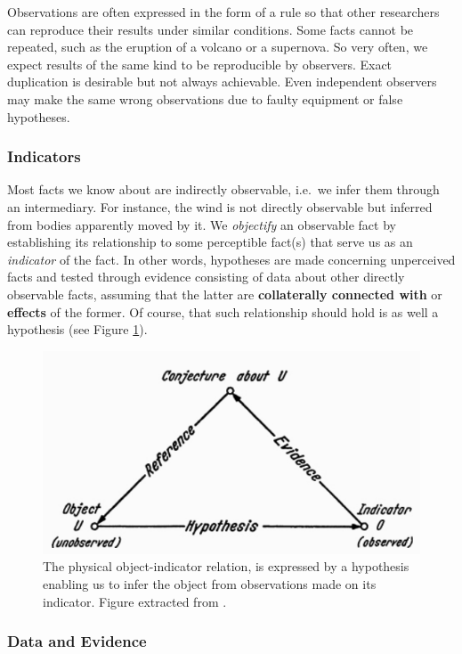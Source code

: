 \documentclass[
]{book}
\begin{document}
Observations are often expressed in the form of a rule so that other researchers can reproduce their results under similar conditions. Some facts cannot be repeated, such as the eruption of a volcano or a supernova. So very often, we expect results of the same kind to be reproducible by observers. Exact duplication is desirable but not always achievable. Even independent observers may make the same wrong observations due to faulty equipment or false hypotheses.

\hypertarget{indicators}{%
\subsubsection{Indicators}\label{indicators}}

Most facts we know about are indirectly observable, i.e.~we infer them through an intermediary. For instance, the wind is not directly observable but inferred from bodies apparently moved by it. We \emph{objectify} an observable fact by establishing its relationship to some perceptible fact(s) that serve us as an \emph{indicator} of the fact. In other words, hypotheses are made concerning unperceived facts and tested through evidence consisting of data about other directly observable facts, assuming that the latter are \textbf{collaterally connected with} or \textbf{effects} of the former. Of course, that such relationship should hold is as well a hypothesis (see Figure \ref{fig:indicator}).



\begin{figure}

{\centering \includegraphics[width=0.5\linewidth]{Figures/indicator} 

}

\caption{The physical object-indicator relation, is expressed by a hypothesis enabling us to infer the object from observations made on its indicator. Figure extracted from \citep{bunge2017philosophy}.}\label{fig:indicator}
\end{figure}

\hypertarget{data-and-evidence}{%
\subsubsection{Data and Evidence}\label{data-and-evidence}}
\end{document}
